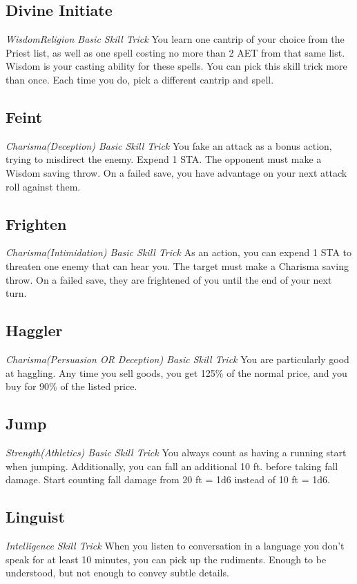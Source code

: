 \subsection{Divine Initiate}
\textit{Wisdom{Religion} Basic Skill Trick}
You learn one cantrip of your choice from the Priest list, as well as one spell costing no more than 2 AET from that same list. Wisdom is your casting ability for these spells. You can pick this skill trick more than once. Each time you do, pick a different cantrip and spell.

\subsection{Feint}\label{st:feint}
\textit{Charisma(Deception) Basic Skill Trick}
You fake an attack as a bonus action, trying to misdirect the enemy. Expend 1 STA. The opponent must make a Wisdom saving throw. On a failed save, you have advantage on your next attack roll against them.

\subsection{Frighten} \label{st:frighten}
\textit{Charisma(Intimidation) Basic Skill Trick}
As an action, you can expend 1 STA to threaten one enemy that can hear you. The target must make a Charisma saving throw. On a failed save, they are frightened of you until the end of your next turn.

\subsection{Haggler}\label{st:haggler}
\textit{Charisma(Persuasion OR Deception) Basic Skill Trick}
You are particularly good at haggling. Any time you sell goods, you get 125\% of the normal price, and you buy for 90\% of the listed price.

\subsection{Jump}
\textit{Strength(Athletics) Basic Skill Trick}
You always count as having a running start when jumping. Additionally, you can fall an additional 10 ft. before taking fall damage. Start counting fall damage from 20 ft = 1d6 instead of 10 ft = 1d6.

\subsection{Linguist}
\textit{Intelligence Skill Trick}
When you listen to conversation in a language you don't speak for at least 10 minutes, you can pick up the rudiments. Enough to be understood, but not enough to convey subtle details.


